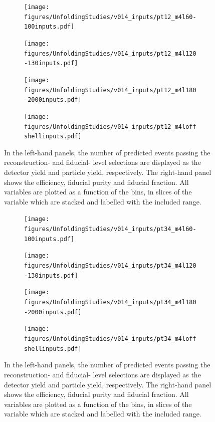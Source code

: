 \FloatBarrier
\clearpage

\begin{figure}[htb]
    \centering 
    \begin{subfigure}{.99\textwidth}\centering
        \texttt{[image: figures/UnfoldingStudies/v014\_inputs/pt12\_m4l60-100inputs.pdf]}
    \end{subfigure}
    \begin{subfigure}{.99\textwidth}\centering
        \texttt{[image: figures/UnfoldingStudies/v014\_inputs/pt12\_m4l120-130inputs.pdf]}
    \end{subfigure}
    \begin{subfigure}{.99\textwidth}\centering
        \texttt{[image: figures/UnfoldingStudies/v014\_inputs/pt12\_m4l180-2000inputs.pdf]}
    \end{subfigure}
    \begin{subfigure}{.99\textwidth}\centering
        \texttt{[image: figures/UnfoldingStudies/v014\_inputs/pt12\_m4loffshellinputs.pdf]}
    \end{subfigure}
    \caption{In the left-hand panels, the number of predicted events passing the reconstruction- and fiducial- level selections are displayed as the detector yield and particle yield, respectively. The right-hand panel shows the efficiency, fiducial purity and fiducial fraction. All variables are plotted as a function of the \ptZOne bins, in slices of the \mFourL variable which are stacked and labelled with the included \mFourL range.
    \label{fig:ptZ1unf}}
\end{figure}  

\FloatBarrier
\clearpage

\begin{figure}[htb]
    \centering 
    \begin{subfigure}{.99\textwidth}\centering
        \texttt{[image: figures/UnfoldingStudies/v014\_inputs/pt34\_m4l60-100inputs.pdf]}
    \end{subfigure}
    \begin{subfigure}{.99\textwidth}\centering
        \texttt{[image: figures/UnfoldingStudies/v014\_inputs/pt34\_m4l120-130inputs.pdf]}
    \end{subfigure}
    \begin{subfigure}{.99\textwidth}\centering
        \texttt{[image: figures/UnfoldingStudies/v014\_inputs/pt34\_m4l180-2000inputs.pdf]}
    \end{subfigure}
    \begin{subfigure}{.99\textwidth}\centering
        \texttt{[image: figures/UnfoldingStudies/v014\_inputs/pt34\_m4loffshellinputs.pdf]}
    \end{subfigure}
    \caption{In the left-hand panels, the number of predicted events passing the reconstruction- and fiducial- level selections are displayed as the detector yield and particle yield, respectively. The right-hand panel shows the efficiency, fiducial purity and fiducial fraction. All variables are plotted as a function of the \ptZTwo bins, in slices of the \mFourL variable which are stacked and labelled with the included \mFourL range.
    \label{fig:ptZ2unf}}
\end{figure}  

